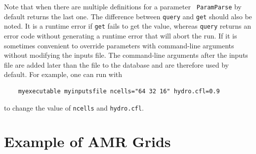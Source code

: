 Note that when there are multiple definitions for a parameter {\tt
  ParamParse} by default returns the last one.  The difference between
{\tt query} and {\tt get} should also be noted.  It is a runtime error
if {\tt get} fails to get the value, whereas {\tt query} returns an
error code without generating a runtime error that will abort the run.
If it is sometimes convenient to override parameters with command-line
arguments without modifying the inputs file.  The command-line
arguments after the inputs file are added later than the file to the
database and are therefore used by default.  For example, one can run
with
\begin{verbatim}
    myexecutable myinputsfile ncells="64 32 16" hydro.cfl=0.9
\end{verbatim}
to change the value of {\tt ncells} and {\tt hydro.cfl}.

\section{Example of AMR Grids}
\label{sec:basics:amrgrids}

